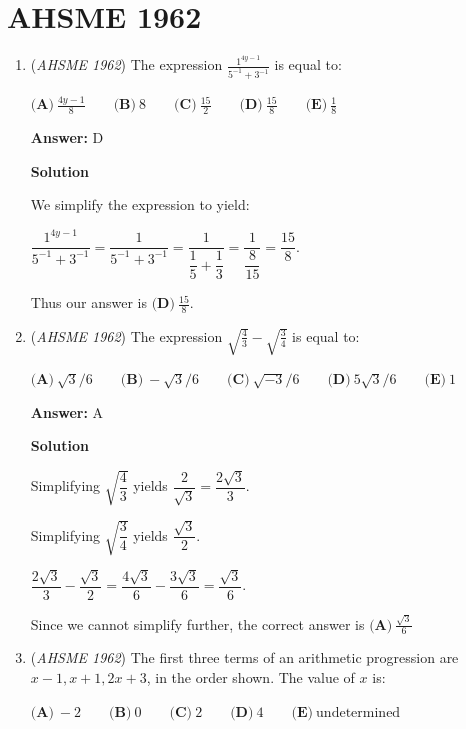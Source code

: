 \section{AHSME 1962}
        \begin{enumerate}
        	\item (\textit{AHSME 1962}) The expression $\frac{1^{4y-1}}{5^{-1}+3^{-1}}$ is equal to:


 $\textbf{(A)}\ \frac{4y-1}{8} \qquad  \textbf{(B)}\ 8 \qquad  \textbf{(C)}\ \frac{15}{2} \qquad  \textbf{(D)}\ \frac{15}{8} \qquad  \textbf{(E)}\ \frac{1}{8}$

 \textbf{Answer: }D



\textbf{Solution}

We simplify the expression to yield:

 $\dfrac{1^{4y-1}}{5^{-1}+3^{-1}}=\dfrac{1}{5^{-1}+3^{-1}}=\dfrac{1}{\dfrac{1}{5}+\dfrac{1}{3}}=\dfrac{1}{\dfrac{8}{15}}=\dfrac{15}{8}$.

 Thus our answer is $\boxed{\textbf{(D)}\ \frac{15}{8}}$.

 


	\item (\textit{AHSME 1962}) The expression $\sqrt{\frac{4}{3}} - \sqrt{\frac{3}{4}}$ is equal to:


 $\textbf{(A)}\ \sqrt{3}/6 \qquad  \textbf{(B)}\ -\sqrt{3}/6 \qquad  \textbf{(C)}\ \sqrt{-3}/6 \qquad  \textbf{(D)}\ 5\sqrt{3}/6 \qquad  \textbf{(E)}\ 1$

 \textbf{Answer: }A



\textbf{Solution}

Simplifying $\sqrt{\dfrac{4}{3}}$ yields $\dfrac{2}{\sqrt{3}}=\dfrac{2\sqrt{3}}{3}$.

 
Simplifying $\sqrt{\dfrac{3}{4}}$ yields $\dfrac{\sqrt{3}}{2}$.

 
$\dfrac{2\sqrt{3}}{3}-\dfrac{\sqrt{3}}{2}=\dfrac{4\sqrt{3}}{6}-\dfrac{3\sqrt{3}}{6}=\dfrac{\sqrt{3}}{6}$.

 
Since we cannot simplify further, the correct answer is $\boxed{\textbf{(A)}\ \frac{\sqrt{3}}{6}}$



	\item (\textit{AHSME 1962}) The first three terms of an arithmetic progression are $x - 1, x + 1, 2x + 3$, in the order shown. The value of $x$ is:


 $\textbf{(A)}\ -2 \qquad  \textbf{(B)}\ 0 \qquad  \textbf{(C)}\ 2 \qquad  \textbf{(D)}\ 4 \qquad  \textbf{(E)}\ \text{undetermined}$


\end{enumerate}
